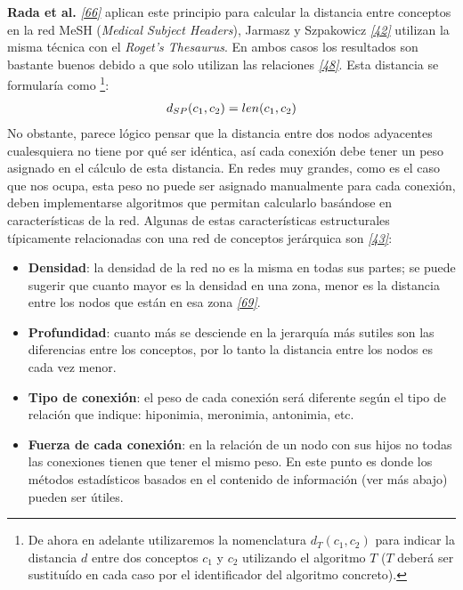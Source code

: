 \documentclass[a4paper,12pt,spanish]{book}
\begin{document}
\textbf{Rada et al.} \label{1.state-of-the-art/ii.medidas-distancia:id30}{\hyperref[zreferences:rada1989]{\emph{{[}66{]}}}} aplican este principio para calcular la distancia entre
conceptos en la red MeSH (\emph{Medical Subject Headers}), Jarmasz y Szpakowicz
\label{1.state-of-the-art/ii.medidas-distancia:id31}{\hyperref[zreferences:jarmasz2003]{\emph{{[}42{]}}}} utilizan la misma técnica con el \emph{Roget's Thesaurus}.
En ambos casos los resultados son bastante buenos debido a que solo utilizan las relaciones
 \label{1.state-of-the-art/ii.medidas-distancia:id32}{\hyperref[zreferences:lee1993]{\emph{{[}48{]}}}}. Esta distancia se formularía como \footnote{
De ahora en adelante utilizaremos la nomenclatura \(d_{T}(c_1, c_2)\) para indicar
la distancia \(d\) entre dos conceptos \(c_1\) y \(c_2\) utilizando el
algoritmo \(T\) (\(T\) deberá ser sustituído en cada caso por el identificador del
algoritmo concreto).
}:
\begin{gather}
\begin{split}d_{SP}(c_1, c_2) = len(c_1, c_2)\end{split}\notag
\end{gather}
No obstante, parece lógico pensar que la distancia entre dos nodos adyacentes cualesquiera
no tiene por qué ser idéntica, así cada conexión debe tener un peso asignado en el cálculo
de esta distancia.
En redes muy grandes, como es el caso que nos ocupa, esta peso no puede ser asignado manualmente
para cada conexión, deben implementarse algoritmos que permitan calcularlo basándose en
características de la red. Algunas de estas características estructurales típicamente
relacionadas con una red de conceptos jerárquica son \label{1.state-of-the-art/ii.medidas-distancia:id35}{\hyperref[zreferences:jiang1997]{\emph{{[}43{]}}}}:
\begin{itemize}
\item {} 
\textbf{Densidad}: la densidad de la red no es la misma en todas sus partes; se puede sugerir
que cuanto mayor es la densidad en una zona, menor es la distancia entre los nodos que
están en esa zona \label{1.state-of-the-art/ii.medidas-distancia:id36}{\hyperref[zreferences:richardson1995]{\emph{{[}69{]}}}}.

\item {} 
\textbf{Profundidad}: cuanto más se desciende en la jerarquía más sutiles son las diferencias
entre los conceptos, por lo tanto la distancia entre los nodos es cada vez menor.

\item {} 
\textbf{Tipo de conexión}: el peso de cada conexión será diferente según el tipo de relación
que indique: hiponimia, meronimia, antonimia, etc.

\item {} 
\textbf{Fuerza de cada conexión}: en la relación de un nodo con sus hijos no todas las
conexiones tienen que tener el mismo peso. En este punto es donde los métodos estadísticos
basados en el contenido de información (ver más abajo) pueden ser útiles.

\end{itemize}
\end{document}
